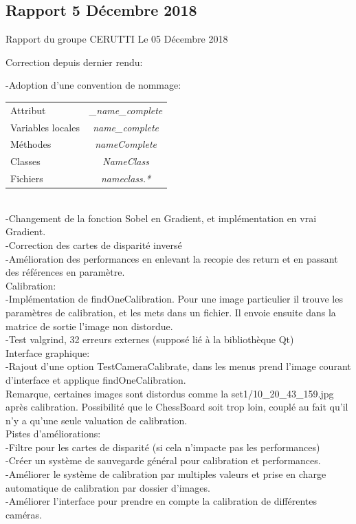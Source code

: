 \documentclass{article}
\begin{document}
\subsection{Rapport 5 Décembre 2018}
Rapport du groupe CERUTTI
Le 05 Décembre 2018


Correction depuis dernier rendu:

    -Adoption d'une convention de nommage:\\
\begin{tabular}{ l c }
   Attribut & \textit{\_name\_complete }\\
   Variables locales  & \textit{name\_complete}\\ 
   Méthodes & \textit{nameComplete}\\
   Classes 	& \textit{NameClass}\\
   Fichiers	& \textit{nameclass.*}\\
 \end{tabular}\\
 
    -Changement de la fonction Sobel en Gradient, et implémentation en vrai Gradient.\\
    -Correction des cartes de disparité inversé\\
    -Amélioration des performances en enlevant la recopie des return et en passant des références en paramètre.\\
   

Calibration:\\
    -Implémentation de findOneCalibration. Pour une image particulier il trouve les paramètres de calibration, et les mets dans un fichier. Il envoie ensuite dans la matrice de sortie l'image non distordue.\\
    -Test valgrind, 32 erreurs externes (supposé lié à la bibliothèque Qt)\\

Interface graphique:\\
    -Rajout d'une option TestCameraCalibrate, dans les menus prend l'image courant d'interface et applique findOneCalibration.\\
Remarque, certaines images sont distordus comme la set1/10\_20\_43\_159.jpg après calibration. Possibilité que le ChessBoard soit trop loin, couplé au fait qu'il n'y a qu'une seule valuation de calibration.
\\

Pistes d'améliorations:\\
    -Filtre pour les cartes de disparité (si cela n'impacte pas les performances)\\
    -Créer un système de sauvegarde général pour calibration et performances.\\
    -Améliorer le système de calibration par multiples valeurs et prise en charge automatique de calibration par dossier d'images.\\
    -Améliorer l'interface pour prendre en compte la calibration de différentes caméras.\\
\end{document}
